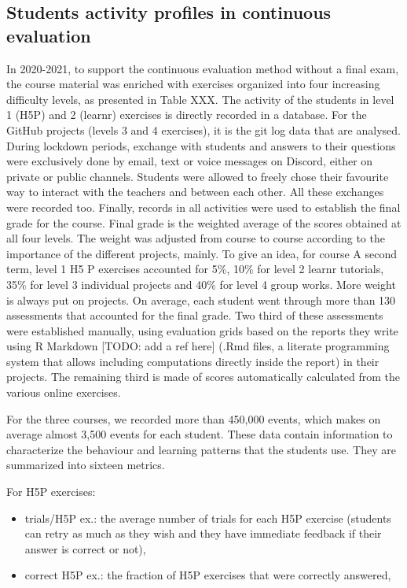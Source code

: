 \documentclass{aims}
\theoremstyle{definition}
\begin{document}
\hypertarget{students-activity-profiles-in-continuous-evaluation}{%
\subsection{Students activity profiles in continuous
evaluation}\label{students-activity-profiles-in-continuous-evaluation}}

In 2020-2021, to support the continuous evaluation method without a
final exam, the course material was enriched with exercises organized
into four increasing difficulty levels, as presented in Table XXX. The
activity of the students in level 1 (H5P) and 2 (learnr) exercises is
directly recorded in a database. For the GitHub projects (levels 3 and 4
exercises), it is the git log data that are analysed. During lockdown
periods, exchange with students and answers to their questions were
exclusively done by email, text or voice messages on Discord, either on
private or public channels. Students were allowed to freely chose their
favourite way to interact with the teachers and between each other. All
these exchanges were recorded too. Finally, records in all activities
were used to establish the final grade for the course. Final grade is
the weighted average of the scores obtained at all four levels. The
weight was adjusted from course to course according to the importance of
the different projects, mainly. To give an idea, for course A second
term, level 1 H5 P exercises accounted for 5\%, 10\% for level 2 learnr
tutorials, 35\% for level 3 individual projects and 40\% for level 4
group works. More weight is always put on projects. On average, each
student went through more than 130 assessments that accounted for the
final grade. Two third of these assessments were established manually,
using evaluation grids based on the reports they write using R Markdown
{[}TODO: add a ref here{]} (.Rmd files, a literate programming system
that allows including computations directly inside the report) in their
projects. The remaining third is made of scores automatically calculated
from the various online exercises.

For the three courses, we recorded more than 450,000 events, which makes
on average almost 3,500 events for each student. These data contain
information to characterize the behaviour and learning patterns that the
students use. They are summarized into sixteen metrics.

For H5P exercises:

\begin{itemize}
\item
  trials/H5P ex.: the average number of trials for each H5P exercise
  (students can retry as much as they wish and they have immediate
  feedback if their answer is correct or not),
\item
  correct H5P ex.: the fraction of H5P exercises that were correctly
  answered,
\end{itemize}
\end{document}
